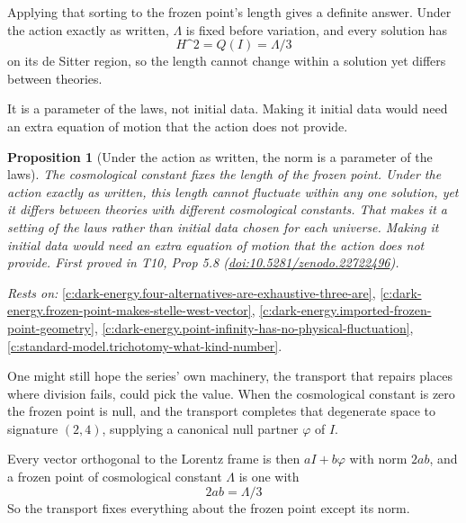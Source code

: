 \documentclass[11pt]{article}
\newtheorem{proposition}[theorem]{Proposition}
\theoremstyle{definition}
\theoremstyle{plain}
\begin{document}
Applying that sorting to the frozen point's length gives a definite answer. Under the action exactly as written, $\Lambda$ is fixed before variation, and every solution has \[ H\^{}2 = Q(I) = \Lambda/3 \] on its de Sitter region, so the length cannot change within a solution yet differs between theories.

It is a parameter of the laws, not initial data. Making it initial data would need an extra equation of motion that the action does not provide.

\begin{proposition}[Under the action as written, the norm is a parameter of the laws]\label{c:dark-energy.under-action-written-norm-parameter-laws}
The cosmological constant fixes the length of the frozen point. Under the action exactly as written, this length cannot fluctuate within any one solution, yet it differs between theories with different cosmological constants. That makes it a setting of the laws rather than initial data chosen for each universe. Making it initial data would need an extra equation of motion that the action does not provide.
\emph{First proved in} T10, Prop 5.8 (\href{https://doi.org/10.5281/zenodo.22722496}{doi:10.5281/zenodo.22722496}).
\end{proposition}
\noindent\emph{Rests on:} \ref{c:dark-energy.four-alternatives-are-exhaustive-three-are}, \ref{c:dark-energy.frozen-point-makes-stelle-west-vector}, \ref{c:dark-energy.imported-frozen-point-geometry}, \ref{c:dark-energy.point-infinity-has-no-physical-fluctuation}, \ref{c:standard-model.trichotomy-what-kind-number}.

One might still hope the series' own machinery, the transport that repairs places where division fails, could pick the value. When the cosmological constant is zero the frozen point is null, and the transport completes that degenerate space to signature $(2,4)$, supplying a canonical null partner $\varphi$ of $I$.

Every vector orthogonal to the Lorentz frame is then $aI + b\varphi$ with norm $2ab$, and a frozen point of cosmological constant $\Lambda$ is one with \[ 2ab = \Lambda/3 \] So the transport fixes everything about the frozen point except its norm.
\end{document}
